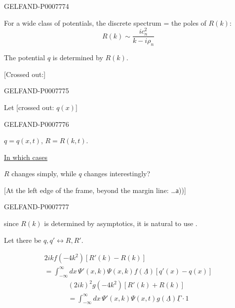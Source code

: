 \begin{GelfandAdjacentEvidence}{GELFAND-P000777}{4}


For a wide class of potentials, the discrete spectrum = the poles of \(R(k)\):
\begin{equation}
R(k)\sim\frac{ic_n^2}{k-i\rho_n}\tag{4}
\end{equation}

The potential \(q\) is determined by \(R(k)\).

[Crossed out:]
\end{GelfandAdjacentEvidence}
\begin{GelfandAdjacentEvidence}{GELFAND-P000777}{5}


Let [crossed out: \(q(x)\)]
\end{GelfandAdjacentEvidence}
\begin{GelfandAdjacentEvidence}{GELFAND-P000777}{6}

\(q=q(x,t)\), \(R=R(k,t)\).

\underline{In which cases}

\(R\) changes simply, while \(q\) changes interestingly?

[At the left edge of the frame, beyond the margin line: …а))]
\end{GelfandAdjacentEvidence}
\begin{GelfandAdjacentEvidence}{GELFAND-P000777}{7}


 since \(R(k)\) is determined by asymptotics, it is natural to use .

 Let there be \(q,q'\longleftrightarrow R,R'\).

\begin{multline}
2ikf(-4k^2)[R'(k)-R(k)]\\
=\int_{-\infty}^{\infty}dx\,\Psi'(x,k)\Psi(x,k)f(\underline\Lambda)[q'(x)-q(x)]\tag{5}
\end{multline}
\begin{multline}
(2ik)^2g(-4k^2)[R'(k)+R(k)]\\
=\int_{-\infty}^{\infty}dx\,\Psi'(x,k)\Psi(x,t)g(\underline\Lambda)\underline\Gamma\cdot1\tag{6}
\end{multline}
\end{GelfandAdjacentEvidence}



